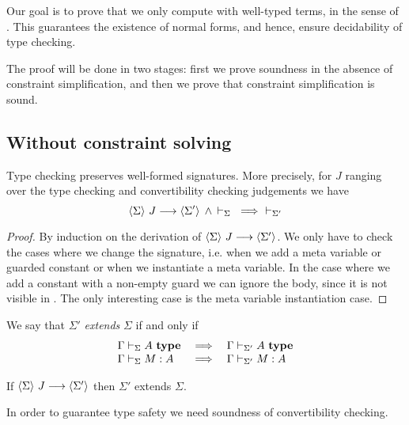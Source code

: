 
Our goal is to prove that we only compute with well-typed terms, in the sense
of {\Core}. This guarantees the existence of normal forms, and hence, ensure
decidability of type checking.

The proof will be done in two stages: first we prove soundness in the absence
of constraint simplification, and then we prove that constraint simplification
is sound.

\subsection{Without constraint solving}

\begin{lemma} \label{lemValidSig}
    Type checking preserves well-formed signatures. More precisely, for $J$
    ranging over the type checking and convertibility checking judgements we
    have
    \[{\langle {\Sigma} \rangle ~{J} \longrightarrow \langle {\Sigma'} \rangle} \, \mathrel{\wedge} \,
	{\vdash_{\Sigma}}  ~ \implies ~ \vdash_{\Sigma'}
    \]
\end{lemma}
\begin{proof}
    By induction on the derivation of $\langle {\Sigma} \rangle ~{J} \longrightarrow \langle {\Sigma'} \rangle$.
    We only have to check the cases where we change the signature, i.e. when we
    add a meta variable or guarded constant or when we instantiate a meta
    variable. In the case where we add a constant with a non-empty guard we can
    ignore the body, since it is not visible in {\Core}. The only interesting
    case is the meta variable instantiation case.
\end{proof}

\begin{definition}
    We say that $\Sigma'$ {\em extends} $\Sigma$ if and only if
    \[\begin{array}{lcl}
	\Gamma\vdash_{\Sigma}A ~ \mathbf{type} & \implies & \Gamma\vdash_{\Sigma'}A ~ \mathbf{type} \\
	\Gamma\vdash_{\Sigma}M:A & \implies & \Gamma\vdash_{\Sigma'}M:A
    \end{array}\]
\end{definition}

\begin{lemma} \label{lemExtendSig}
    If $\langle {\Sigma} \rangle ~{J} \longrightarrow \langle {\Sigma'} \rangle$ then $\Sigma'$ extends $\Sigma$.
\end{lemma}

In order to guarantee type safety we need soundness of convertibility checking.

